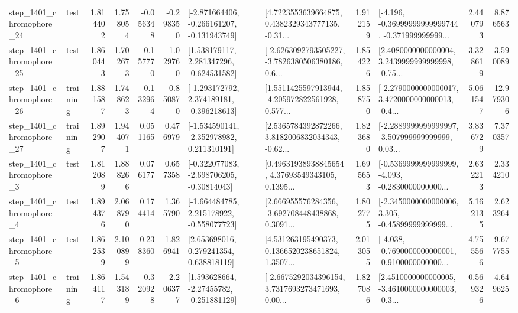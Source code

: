 \begin{tabular}{llrrrrllrlrr}
 step\_1401\_chromophore\_24 &      test &      1.814402 &    1.758054 &     -0.056348 & -0.298350 &  [-2.871664406, -0.266161207, -0.131943749] &  [4.7223553639664875, 0.4382329343777135, -0.31... &       1.912159 &  [-4.196, -0.36999999999999744, -0.371999999999... &            2.440793 &          8.876563 \\
 step\_1401\_chromophore\_25 &      test &      1.860443 &    1.702673 &     -0.157770 & -1.029760 &    [1.538179117, 2.281347296, -0.624531582] &  [-2.6263092793505227, -3.7826380506380186, 0.6... &       1.854226 &  [2.4080000000000004, 3.2439999999999998, -0.75... &            3.328619 &          3.590089 \\
 step\_1401\_chromophore\_26 &  training &      1.881587 &    1.748623 &     -0.132964 & -0.850870 &   [-1.293172792, 2.374189181, -0.396218613] &  [1.5511425597913944, -4.205972822561928, 0.577... &       1.858750 &  [-2.2790000000000017, 3.4720000000000013, -0.4... &            5.061547 &         12.979306 \\
 step\_1401\_chromophore\_27 &  training &      1.892907 &    1.944071 &      0.051165 &  0.476979 &   [-1.534590141, -2.352978982, 0.211310191] &  [2.5365784392872266, 3.8182006832034343, -0.62... &       1.823680 &  [-2.2889999999999997, -3.507999999999999, 0.03... &            3.836729 &          7.370357 \\
  step\_1401\_chromophore\_3 &      test &      1.812089 &    1.888266 &      0.076177 &  0.657358 &   [-0.322077083, -2.698706205, -0.30814043] &  [0.49631938938845654, 4.37693549343105, 0.1395... &       1.695653 &  [-0.5369999999999999, -4.093, -0.2830000000000... &            2.632213 &          2.334210 \\
  step\_1401\_chromophore\_4 &      test &      1.894376 &    2.068790 &      0.174414 &  1.365790 &   [-1.664484785, 2.215178922, -0.558077723] &  [2.666955576284356, -3.692708448438868, 0.3091... &       1.802775 &  [-2.3450000000000006, 3.305, -0.45899999999999... &            5.162135 &          2.623264 \\
  step\_1401\_chromophore\_5 &      test &      1.862539 &    2.100899 &      0.238360 &  1.826941 &     [2.653698016, 0.279241354, 0.638818119] &  [4.531263195490373, 0.1366520238651824, 1.3507... &       2.013055 &  [-4.038, -0.7690000000000001, -0.9100000000000... &            4.755566 &          9.677755 \\
  step\_1401\_chromophore\_6 &  training &      1.864117 &    1.543189 &     -0.320928 & -2.206377 &    [1.593628664, -2.27455782, -0.251881129] &  [-2.6675292034396154, 3.7317693273471693, 0.00... &       1.827086 &  [2.4510000000000005, -3.4610000000000003, -0.3... &            0.569326 &          4.649625 \\

\end{tabular}

